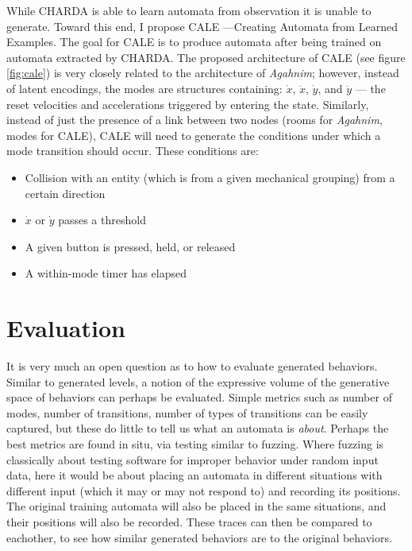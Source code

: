 \documentclass[12pt]{report}
\begin{document}
While CHARDA is able to learn automata from observation it is unable to generate.  Toward this end, I propose CALE ---Creating Automata from Learned Examples.  The goal for CALE is to produce automata after being trained on automata extracted by CHARDA.  The proposed architecture of CALE (see figure \ref{fig:cale}) is very closely related to the architecture of \textit{Agahnim}; however, instead of latent encodings, the modes are structures containing: $\dot{x}$, $\ddot{x}$, $\dot{y}$, and $\ddot{y}$  --- the reset velocities and accelerations triggered by entering the state.  Similarly, instead of just the presence of a link between two nodes (rooms for \textit{Agahnim}, modes for CALE), CALE will need to generate the conditions under which a mode transition should occur.  These conditions are:

\begin{itemize}
\item Collision with an entity (which is from a given mechanical grouping) from a certain direction
\item  $\dot{x}$ or  $\dot{y}$ passes a threshold
\item A given button is pressed, held, or released
\item A within-mode timer has elapsed
\end{itemize}


\section*{Evaluation}

It is very much an open question as to how to evaluate generated behaviors.  Similar to generated levels, a notion of the expressive volume of the generative space of behaviors can perhaps be evaluated.  Simple metrics such as number of modes, number of transitions, number of types of transitions can be easily captured, but these do little to tell us what an automata is \textit{about}.  Perhaps the best metrics are found in situ, via testing similar to fuzzing.  Where fuzzing is classically about testing software for improper behavior under random input data, here it would be about placing an automata in different situations with different input (which it may or may not respond to) and recording its positions.  The original training automata will also be placed in the same situations, and their positions will also be recorded.  These traces can then be compared to eachother, to see how similar generated behaviors are to the original behaviors.
\end{document}
